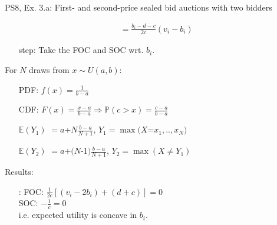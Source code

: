 \begin{frame}{PS8, Ex. 3.a: First- and second-price sealed bid auctions with two bidders}
\begin{multicols}{2}
\begin{align*}
                                &=\frac{b_i-d-c}{2c}(v_i-b_i)
      \end{align*}
      \vspace{-10pt}
      \begin{itemize}
        \item[\nth{2} step:] Take the FOC and SOC wrt. $b_i$.
      \end{itemize}
      \vfill\null\columnbreak
      For $N$ draws from $x\sim U(a, b):$
      \vspace{-6pt}
      \begin{enumerate}
        \item[PDF:] $f(x)=\frac{1}{b-a}$
        \item[CDF:] $F(x)=\frac{x-a}{b-a}\Rightarrow\mathbb{P}(c>x)=\frac{c-a}{b-a}$
        \item[$\mathbb{E}(Y_1)$] $=a$+$N\frac{b-a}{N+1}$, $Y_1=\max(X$=$x_1,..,x_N)$
        \item[$\mathbb{E}(Y_2)$] $=a$+$(N$-1$)\frac{b-a}{N+1}$, $Y_2=\max(X\neq Y_1)$
      \end{enumerate}
      \vspace{-6pt}
      Results:
      \vspace{-6pt}
      \begin{itemize}
        \item[\nth{2}:] FOC: $\frac{1}{2c}[(v_i-2b_i)+(d+c)]=0$\\
                        SOC: $-\frac{1}{c}=0$\\
                        i.e. expected utility is concave in $b_i$.
      \end{itemize}
      \vfill\null
    \end{multicols}
\end{frame}
